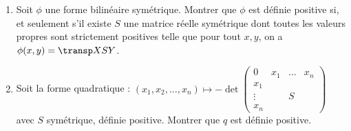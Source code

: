 \begin{enonce}
\begin{exercise}[ID={RMS124 E660 Mines-Ponts PSI},subtitle={},tags={}]
\begin{enumerate}
  \item Soit $\phi$ une forme bilinéaire symétrique.
  Montrer que $\phi$ est définie positive si, et seulement s'il existe $S$ une matrice réelle symétrique dont toutes les valeurs propres sont strictement positives telle que pour tout $x,y$, on a $\phi(x,y)=\transp X S Y$.
\item Soit la forme quadratique :
  \begin{math}
    (x_1, x_2,\dots, x_n) \mapsto
    - \det \begin{pmatrix}
    0 & x_1 & \dots & x_n\\
    x_1 &&&\\
    \vdots & & S & \\
    x_n &&&
    \end{pmatrix}
  \end{math}
  avec $S$ symétrique, définie positive.
  Montrer que $q$ est définie positive.
\end{enumerate}
\end{exercise}
\begin{solution}
\end{solution}
\end{enonce}
